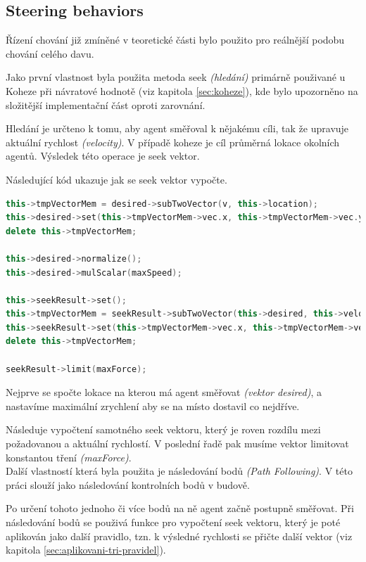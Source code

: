 \documentclass[czech,public,dept460,male,cpdeclaration]{diploma}
\begin{document}
\subsection{Steering behaviors}\label{sec:steering-behaviors}
Řízení chování \cite{linkToSteeringBehaviors} již zmíněné v teoretické části bylo použito pro reálnější podobu chování celého davu.

Jako první vlastnost byla použita metoda seek \textit{(hledání)} primárně použivané u Koheze při návratové hodnotě (viz kapitola \ref{sec:koheze}), kde bylo upozorněno na složitější implementační část oproti zarovnání.

Hledání je určteno k tomu, aby agent směřoval k nějakému cíli, tak že upravuje aktuální rychlost \textit{(velocity)}. V případě koheze je cíl průměrná lokace okolních agentů. Výsledek této operace je seek vektor.

Následující kód ukazuje jak se seek vektor vypočte.

\begin{lstlisting}[language=c++,label=src:seek,caption=Vypočtení seek vektoru]
this->tmpVectorMem = desired->subTwoVector(v, this->location);
this->desired->set(this->tmpVectorMem->vec.x, this->tmpVectorMem->vec.y, this->tmpVectorMem->vec.z);
delete this->tmpVectorMem;

this->desired->normalize();
this->desired->mulScalar(maxSpeed);

this->seekResult->set();
this->tmpVectorMem = seekResult->subTwoVector(this->desired, this->velocity);
this->seekResult->set(this->tmpVectorMem->vec.x, this->tmpVectorMem->vec.y, this->tmpVectorMem->vec.z);
delete this->tmpVectorMem;

seekResult->limit(maxForce);
\end{lstlisting}

Nejprve se spočte lokace na kterou má agent směřovat \textit{(vektor desired)}, a nastavíme maximální zrychlení aby se na místo dostavil co nejdříve.

Následuje vypočtení samotného seek vektoru, který je roven rozdílu mezi požadovanou a aktuální rychlostí. V poslední řadě pak musíme vektor limitovat konstantou tření \textit{(maxForce)}.
\\

Další vlastností která byla použita je následování bodů \textit{(Path Following)}. V této práci slouží jako následování kontrolních bodů v budově.

Po určení tohoto jednoho či více bodů na ně agent začně postupně směřovat. Při následování bodů se použivá funkce pro vypočtení seek vektoru, který je poté aplikován jako další pravidlo, tzn. k výsledné rychlosti se přičte další vektor (viz kapitola \ref{sec:aplikovani-tri-pravidel}).
\end{document}
